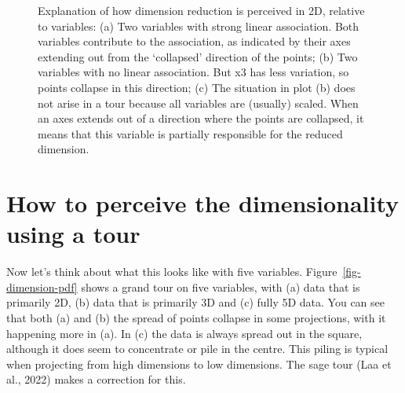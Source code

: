 \documentclass[
  letterpaper,
]{krantz}
\begin{document}
\begin{figure}


\caption{\label{fig-2D}Explanation of how dimension reduction is
perceived in 2D, relative to variables: (a) Two variables with strong
linear association. Both variables contribute to the association, as
indicated by their axes extending out from the `collapsed' direction of
the points; (b) Two variables with no linear association. But x3 has
less variation, so points collapse in this direction; (c) The situation
in plot (b) does not arise in a tour because all variables are (usually)
scaled. When an axes extends out of a direction where the points are
collapsed, it means that this variable is partially responsible for the
reduced dimension.}

\end{figure}%

\section{How to perceive the dimensionality using a
tour}\label{how-to-perceive-the-dimensionality-using-a-tour}

Now let's think about what this looks like with five variables.
Figure~\ref{fig-dimension-pdf} shows a grand tour on five variables,
with (a) data that is primarily 2D, (b) data that is primarily 3D and
(c) fully 5D data. You can see that both (a) and (b) the spread of
points collapse in some projections, with it happening more in (a). In
(c) the data is always spread out in the square, although it does seem
to concentrate or pile in the centre. This piling is typical when
projecting from high dimensions to low dimensions. The sage tour (Laa et
al., 2022) makes a correction for this.
\end{document}
